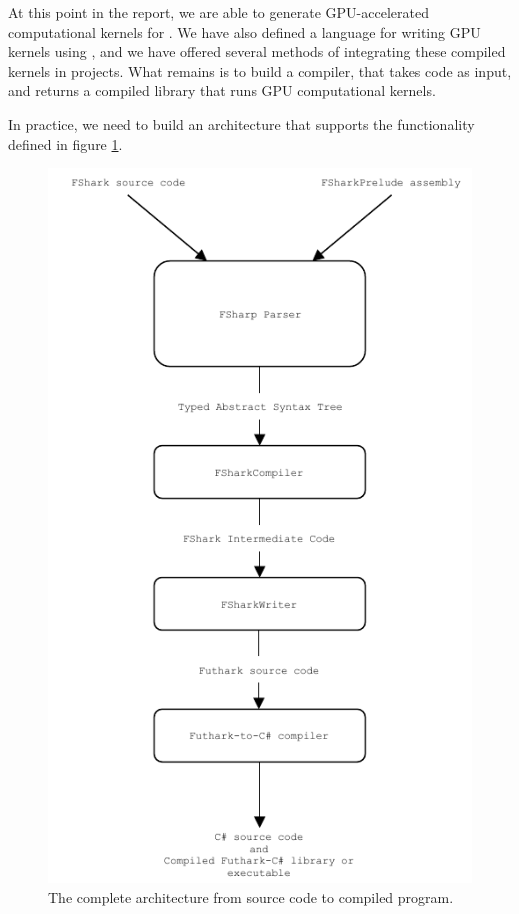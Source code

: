 At this point in the report, we are able to generate GPU-accelerated
computational kernels for \csharp{}. We
have also defined a language for writing GPU kernels using \fsharp{}, and we have
offered several methods of integrating these compiled \csharp{} kernels in
\fsharp{} projects. What remains is to build a compiler, that takes \fshark{}
code as input, and returns a compiled \csharp{} library that runs GPU
computational kernels.

In practice, we need to build an architecture that supports the functionality
defined in figure \ref{fig:fsharkcompilerarchitecture}.

\begin{figure}[H]
  \centering
  \includegraphics[scale=1.15]{chapters/figs/compilerarchitecture.pdf}
  \caption{The complete architecture from \fshark{} source code to compiled
    \csharp{} program.}
  \label{fig:fsharkcompilerarchitecture}
\end{figure}


